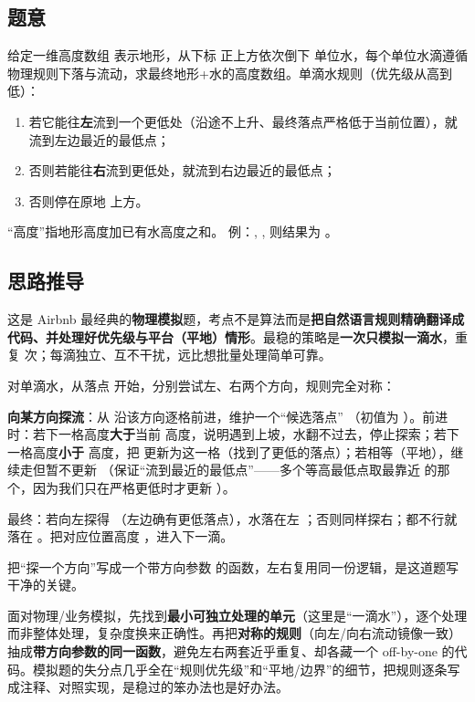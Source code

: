 
\subsection*{题意}
给定一维高度数组  表示地形，从下标  正上方依次倒下  单位水，每个单位水滴遵循物理规则下落与流动，求最终地形+水的高度数组。单滴水规则（优先级从高到低）：
\begin{enumerate}
  \item 若它能往\textbf{左}流到一个更低处（沿途不上升、最终落点严格低于当前位置），就流到左边最近的最低点；
  \item 否则若能往\textbf{右}流到更低处，就流到右边最近的最低点；
  \item 否则停在原地  上方。
\end{enumerate}
“高度”指地形高度加已有水高度之和。
例：, ,  则结果为 \code{[2,2,2,3,2,2,2]}。

\subsection*{思路推导}
这是 Airbnb 最经典的\textbf{物理模拟}题，考点不是算法而是\textbf{把自然语言规则精确翻译成代码、并处理好优先级与平台（平地）情形}。最稳的策略是\textbf{一次只模拟一滴水}，重复  次；每滴独立、互不干扰，远比想批量处理简单可靠。

对单滴水，从落点  开始，分别尝试左、右两个方向，规则完全对称：

\textbf{向某方向探流}：从  沿该方向逐格前进，维护一个“候选落点” （初值为 ）。前进时：若下一格高度\textbf{大于}当前  高度，说明遇到上坡，水翻不过去，停止探索；若下一格高度\textbf{小于}  高度，把  更新为这一格（找到了更低的落点）；若相等（平地），继续走但暂不更新 （保证“流到最近的最低点”——多个等高最低点取最靠近  的那个，因为我们只在严格更低时才更新 ）。

最终：若向左探得 （左边确有更低落点），水落在左 ；否则同样探右；都不行就落在 。把对应位置高度 ，进入下一滴。

把“探一个方向”写成一个带方向参数  的函数，左右复用同一份逻辑，是这道题写干净的关键。

\begin{idea}
面对物理/业务模拟，先找到\textbf{最小可独立处理的单元}（这里是“一滴水”），逐个处理而非整体处理，复杂度换来正确性。再把\textbf{对称的规则}（向左/向右流动镜像一致）抽成\textbf{带方向参数的同一函数}，避免左右两套近乎重复、却各藏一个 off-by-one 的代码。模拟题的失分点几乎全在“规则优先级”和“平地/边界”的细节，把规则逐条写成注释、对照实现，是稳过的笨办法也是好办法。
\end{idea}

